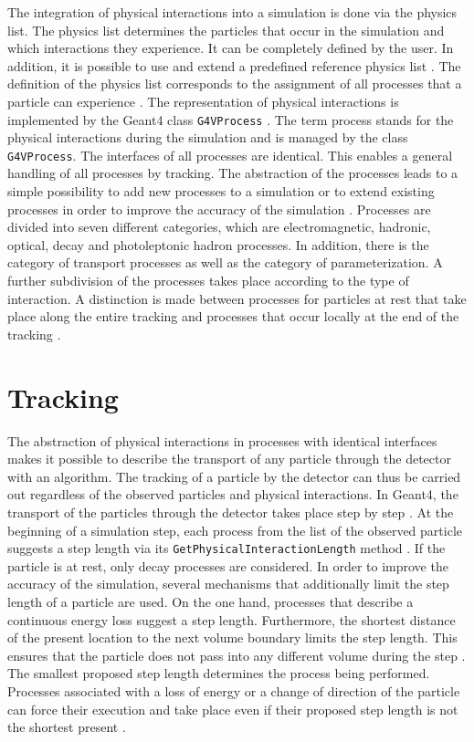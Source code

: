 \documentclass[12pt, a4paper]{thesis}
\begin{document}
The integration of physical interactions into a simulation is done via
the physics list. The physics list determines the particles that occur
in the simulation and which interactions they experience. It can be
completely defined by the user. In addition, it is possible to use and
extend a predefined reference physics list \cite{geant4-rec-dev}. The
definition of the physics list corresponds to the assignment of all
processes that a particle can experience
\cite{geant_simul_toolkit}. The representation of physical
interactions is implemented by the Geant4 class \texttt{G4VProcess}
\cite{geant_simul_toolkit}. The term process stands for the physical
interactions during the simulation and is managed by the class
\texttt{G4VProcess}. The interfaces of all processes are
identical. This enables a general handling of all processes by
tracking. The abstraction of the processes leads to a simple
possibility to add new processes to a simulation or to extend existing
processes in order to improve the accuracy of the simulation
\cite{geant4-doc}. Processes are divided into seven different
categories, which are electromagnetic, hadronic, optical, decay and
photoleptonic hadron processes. In addition, there is the category of
transport processes as well as the category of parameterization. A
further subdivision of the processes takes place according to the type
of interaction. A distinction is made between processes for particles
at rest that take place along the entire tracking and processes that
occur locally at the end of the tracking \cite{geant_simul_toolkit}.

\clearpage
\section{Tracking}
\label{sec:org2ff4601}

The abstraction of physical interactions in processes with identical
interfaces makes it possible to describe the transport of any particle
through the detector with an algorithm. The tracking of a particle by
the detector can thus be carried out regardless of the observed
particles and physical interactions.  In Geant4, the transport of the
particles through the detector takes place step by step
\cite{geant_simul_toolkit}.  At the beginning of a simulation step, each
process from the list of the observed particle suggests a step length
via its \texttt{GetPhysicalInteractionLength} method
\cite{geant_simul_toolkit}. If the particle is at rest, only decay
processes are considered. In order to improve the accuracy of the
simulation, several mechanisms that additionally limit the step length
of a particle are used. On the one hand, processes that describe a
continuous energy loss suggest a step length. Furthermore, the
shortest distance of the present location to the next volume boundary
limits the step length.  This ensures that the particle does not pass
into any different volume during the step \cite{geant4-rec-dev}. The
smallest proposed step length determines the process being
performed. Processes associated with a loss of energy or a change of
direction of the particle can force their execution and take place
even if their proposed step length is not the shortest present
\cite{geant_simul_toolkit}.
\end{document}
